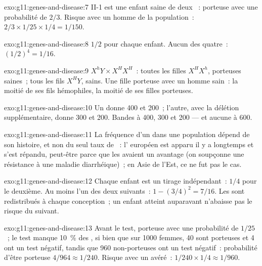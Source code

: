 \begin{solution}{exo:g11:genes-and-disease:7}
II-1 est une enfant saine de deux ~: porteuse avec une
probabilité de $2/3$. Risque avec un homme de la population~: $2/3 \times 1/25 \times 1/4
= 1/150$.
\end{solution}

\begin{solution}{exo:g11:genes-and-disease:8}
$1/2$ pour chaque enfant. Aucun des quatre~: $(1/2)^4 = 1/16$.
\end{solution}

\begin{solution}{exo:g11:genes-and-disease:9}
$X^hY \times X^HX^H$~: toutes les filles $X^HX^h$, porteuses saines~;
tous les fils $X^HY$, sains. Une fille porteuse avec un homme sain~: la
moitié de ses fils hémophiles, la moitié de ses filles porteuses.
\end{solution}

\begin{solution}{exo:g11:genes-and-disease:10}
Un  donne 400 et 200~; l'autre, avec la délétion
supplémentaire, donne 300 et 200. Bandes à 400, 300 et 200 --- et
aucune à 600.
\end{solution}

\begin{solution}{exo:g11:genes-and-disease:11}
La fréquence d'un  dans une population dépend de son histoire, et
non du seul taux de ~: l' européen est apparu il y a
longtemps et s'est répandu, peut-être parce que les  avaient un
avantage (on soupçonne une résistance à une maladie diarrhéique)~; en
Asie de l'Est, ce ne fut pas le cas.
\end{solution}

\begin{solution}{exo:g11:genes-and-disease:12}
Chaque enfant est un tirage indépendant~: $1/4$ pour le deuxième. Au
moins l'un des deux suivants~: $1 - (3/4)^2 = 7/16$. Les  sont
redistribués à chaque conception~; un enfant atteint auparavant
n'abaisse pas le risque du suivant.
\end{solution}

\begin{solution}{exo:g11:genes-and-disease:13}
Avant le test, porteuse avec une probabilité de $1/25$~; le test
manque 10~\% des , si bien que sur 1000 femmes, 40 sont
porteuses et 4 ont un test négatif, tandis que 960 non-porteuses ont un
test négatif~: probabilité d'être porteuse
$4/964 \approx 1/240$. Risque avec un  avéré~: $1/240 \times 1/4
\approx 1/960$.
\end{solution}

